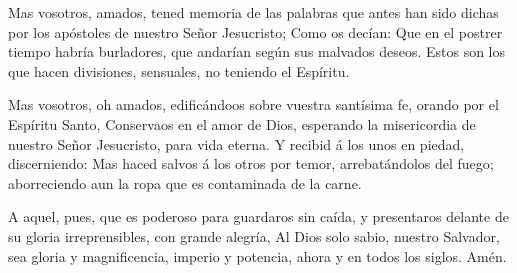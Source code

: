  Mas vosotros, amados, tened memoria de las palabras que
antes han sido dichas por los apóstoles de nuestro Señor Jesucristo;
 Como os decían: Que en el postrer tiempo habría
burladores, que andarían según sus malvados deseos. 
Estos son los que hacen divisiones, sensuales, no teniendo el Espíritu.

 Mas vosotros, oh amados, edificándoos sobre vuestra
santísima fe, orando por el Espíritu Santo,  Conservaos
en el amor de Dios, esperando la misericordia de nuestro Señor
Jesucristo, para vida eterna.  Y recibid á los unos en
piedad, discerniendo:  Mas haced salvos á los otros por
temor, arrebatándolos del fuego; aborreciendo aun la ropa que es
contaminada de la carne.

 A aquel, pues, que es poderoso para guardaros sin caída,
y presentaros delante de su gloria irreprensibles, con grande alegría,
 Al Dios solo sabio, nuestro Salvador, sea gloria y
magnificencia, imperio y potencia, ahora y en todos los siglos. Amén.
